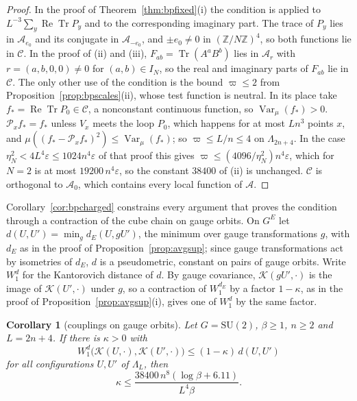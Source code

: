 \documentclass[aps,prd,twocolumn,superscriptaddress,nofootinbib,longbibliography,floatfix,amsmath,amssymb,10pt]{revtex4-2}
\newtheorem{corollary}[theorem]{Corollary}
\theoremstyle{definition}
\theoremstyle{remark}
\newcommand{\Z}{\mathbb{Z}}
\newcommand{\SU}{\mathrm{SU}}
\newcommand{\Tr}{\operatorname{Tr}}
\newcommand{\ReTr}{\operatorname{Re}\operatorname{Tr}}
\newcommand{\Var}{\operatorname{Var}}
\begin{document}
\begin{proof}
In the proof of Theorem~\ref{thm:bpfixed}(i) the condition is applied to
$L^{-3}\sum_y\ReTr P_y$ and to the corresponding imaginary part. The trace of
$P_y$ lies in $\mathcal A_{e_0}$ and its conjugate in $\mathcal A_{-e_0}$,
and $\pm e_0\ne0$ in $(\Z/N\Z)^4$, so both functions lie in $\mathcal C$. In
the proof of (ii) and (iii), $F_{ab}=\Tr(A^aB^b)$ lies in $\mathcal A_r$ with
$r=(a,b,0,0)\ne0$ for $(a,b)\in I_N$, so the real and imaginary parts of
$F_{ab}$ lie in $\mathcal C$. The only other use of the condition is the
bound $\varpi\le2$ from Proposition~\ref{prop:bpscales}(ii), whose test
function is neutral. In its place take $f_*=\ReTr P_0\in\mathcal C$, a
nonconstant continuous function, so $\Var_\mu(f_*)>0$. $\mathcal P_xf_*=f_*$
unless $V_x$ meets the loop $P_0$, which happens for at most $Ln^3$ points
$x$, and $\mu((f_*-\mathcal P_xf_*)^2)\le\Var_\mu(f_*)$; so $\varpi\le L/n
\le4$ on $\Lambda_{2n+4}$. In the case $\eta_N^2<4L^4\varepsilon\le1024n^4
\varepsilon$ of that proof this gives $\varpi\le(4096/\eta_N^2)n^4
\varepsilon$, which for $N=2$ is at most $19200\,n^4\varepsilon$, so the
constant $38400$ of (ii) is unchanged. $\mathcal C$ is orthogonal to
$\mathcal A_0$, which contains every local function of $\mathcal A$.
\end{proof}

Corollary~\ref{cor:bpcharged} constrains every argument that proves the
condition through a contraction of the cube chain on gauge orbits. On $G^E$ let $d(U,U')=\min_g
d_E(U,gU')$, the minimum over gauge transformations $g$, with $d_E$ as in the
proof of Proposition~\ref{prop:avgsup}; since gauge transformations act by
isometries of $d_E$, $d$ is a pseudometric, constant on pairs of gauge
orbits. Write $W_1^d$ for the Kantorovich distance of $d$. By gauge covariance,
$\mathcal K(gU',\cdot)$ is the image of $\mathcal K(U',\cdot)$ under $g$, so
a contraction of $W_1^{d_E}$ by a factor $1-\kappa$, as in the proof of
Proposition~\ref{prop:avgsup}(i), gives one of $W_1^d$ by the same factor.

\begin{corollary}[couplings on gauge orbits]\label{cor:bpcoupling}
Let $G=\SU(2)$, $\beta\ge1$, $n\ge2$ and $L=2n+4$. If there is $\kappa>0$
with
\[
W_1^d\bigl(\mathcal K(U,\cdot),\mathcal K(U',\cdot)\bigr)\le(1-\kappa)\,
d(U,U')
\]
for all configurations $U,U'$ of $\Lambda_L$, then
\[
\kappa\le\frac{38400\,n^8(\log\beta+6.11)}{L^4\beta}.
\]
\end{corollary}
\end{document}
